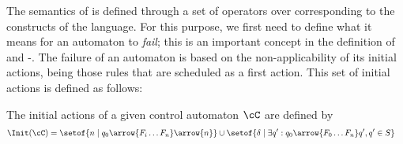 The semantics of \Lang{} is defined through a set of operators over \CAut{}
corresponding to the constructs of the language. For this purpose, we first
need to define what it means for an automaton to \emph{fail}; this is an
important concept in the definition of \alapK{} and \tryK-\elseK. The failure
of an automaton is based on the non-applicability of its initial actions, being
those rules that are scheduled as a first action.  This set of initial actions
is defined as follows:

\begin{definition}
The initial actions of a given control automaton $\cC$ are defined by
\begin{align*}
\Init(\cC) &= \setof{ n \mid q_0 \arrow{F_i \dotsc F_n}\arrow{n} } \cup
              \setof{ \delta \mid \exists q':q_0 \arrow{F_0 \dotsc F_n} q', q' \in S }
\end{align*}
\end{definition}

